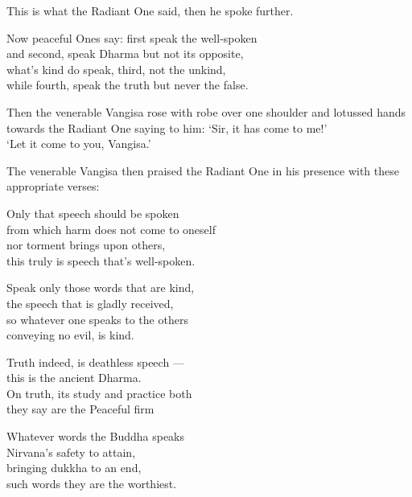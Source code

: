 This is what the Radiant One said, then he spoke further.

\begin{MyDescription}{}
Now peaceful Ones say: first speak the well-spoken\\
and second, speak Dharma but not its opposite,\\
what's kind do speak, third, not the unkind,\\
while fourth, speak the truth but never the false.
\end{MyDescription}
 
Then the venerable Vangisa rose with robe over one shoulder and lotussed hands towards the Radiant One saying to him: `Sir, it has come to me!'\\

`Let it come to you, Vangisa.'

The venerable Vangisa then praised the Radiant One in his presence with these appropriate verses:

\begin{MyDescription}{}
Only that speech should be spoken\\
from which harm does not come to oneself\\
nor torment brings upon others,\\
this truly is speech that's well-spoken.
\end{MyDescription}

\begin{MyDescription}{}
Speak only those words that are kind,\\
the speech that is gladly received,\\
so whatever one speaks to the others\\
conveying no evil, is kind.
\end{MyDescription}

\begin{MyDescription}{}
Truth indeed, is deathless speech —\\
this is the ancient Dharma.\\
On truth, its study and practice both\\
they say are the Peaceful firm
\end{MyDescription}

\begin{MyDescription}{}
Whatever words the Buddha speaks\\
Nirvana's safety to attain,\\
bringing dukkha to an end,\\
such words they are the worthiest.
\end{MyDescription}
\newpage
